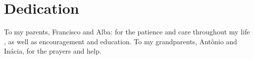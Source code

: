 
\chapter*{Dedication}
\vspace{15cm}
\begin{flushright}
To my parents, Francisco and Alba: for the patience and care throughout my life , as well as encouragement and education. To my grandparents, Antônio and Inácia, for the prayers and help.
\end{flushright}